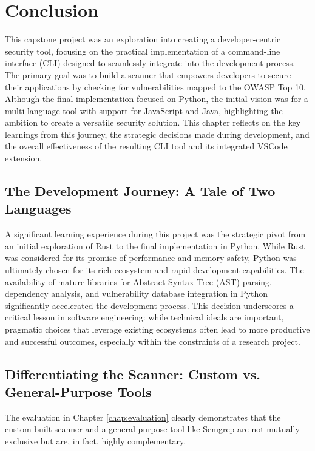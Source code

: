 \chapter{Conclusion}
\label{chap:conclusion}

This capstone project was an exploration into creating a developer-centric security tool, focusing on the practical implementation of a command-line interface (CLI) designed to seamlessly integrate into the development process. The primary goal was to build a scanner that empowers developers to secure their applications by checking for vulnerabilities mapped to the OWASP Top 10. Although the final implementation focused on Python, the initial vision was for a multi-language tool with support for JavaScript and Java, highlighting the ambition to create a versatile security solution. This chapter reflects on the key learnings from this journey, the strategic decisions made during development, and the overall effectiveness of the resulting CLI tool and its integrated VSCode extension.

\section{The Development Journey: A Tale of Two Languages}

A significant learning experience during this project was the strategic pivot from an initial exploration of Rust to the final implementation in Python. While Rust was considered for its promise of performance and memory safety, Python was ultimately chosen for its rich ecosystem and rapid development capabilities. The availability of mature libraries for Abstract Syntax Tree (AST) parsing, dependency analysis, and vulnerability database integration in Python significantly accelerated the development process. This decision underscores a critical lesson in software engineering: while technical ideals are important, pragmatic choices that leverage existing ecosystems often lead to more productive and successful outcomes, especially within the constraints of a research project.

\section{Differentiating the Scanner: Custom vs. General-Purpose Tools}

The evaluation in Chapter \ref{chap:evaluation} clearly demonstrates that the custom-built scanner and a general-purpose tool like Semgrep are not mutually exclusive but are, in fact, highly complementary.

